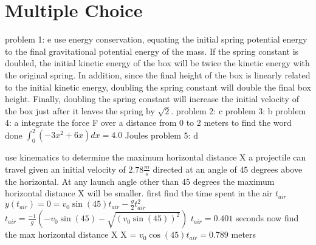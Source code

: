 \chapter{Multiple Choice}
\label{Multiple Choice}
problem 1: e 
\newline
use energy conservation, equating the initial spring potential energy to the final gravitational\newline
potential energy of the mass. If the spring constant is doubled, the initial kinetic energy of\newline
the box will be twice the kinetic energy with the original spring. In addition, since the final\newline
height of the box is linearly related to the initial kinetic energy, doubling the spring constant\newline
will double the final box height. Finally, doubling the spring constant will increase the initial\newline
velocity of the box just after it leaves the spring by $\sqrt{2}$.\newline
problem 2: c
\newline
problem 3: b
\newline
problem 4: a
\newline
integrate the force F over a distance from 0 to 2 meters to find the word done\newline
$\int_0^2 \!(-3x^{2} + 6x) dx = 4.0$ Joules\newline
problem 5: d\newline

use kinematics to determine the maximum horizontal distance X a projectile\newline
can travel given an initial velocity of $2.78 \frac{m}{s}$ directed\newline
at an angle of $45$ degrees above the horizontal.\newline
At any launch angle other than $45$ degrees the maximum horizontal\newline
distance X will be smaller.\newline
first find the time spent in the air $t_{air}$\newline
$y(t_{air}) = 0 = v_{0}\sin(45)t_{air} - \frac{g}{2}t_{air}^{2}$\newline
$t_{air} = \frac{-1}{g}(-v_{0}\sin(45) - \sqrt{(v_{0}\sin(45))^{2}})$\newline
$t_{air} = 0.401$ seconds\newline
now find the max horizontal distance X\newline
X = $v_{0}\cos(45)t_{air} = 0.789$ meters\newline

